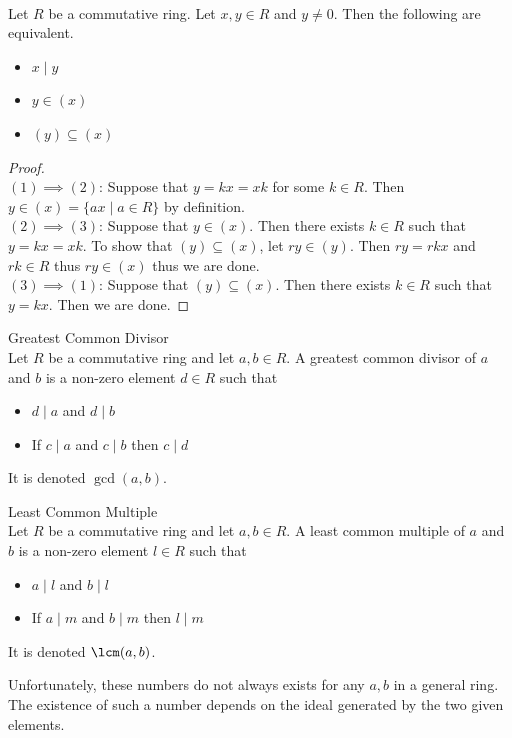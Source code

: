 \documentclass[a4paper]{article}
\begin{document}
\begin{prp}{}{}\\
Let $R$ be a commutative ring. Let $x,y\in R$ and $y\neq 0$. Then the following are equivalent. 
\begin{itemize}
\item $x\;|\;y$
\item $y\in(x)$
\item $(y)\subseteq(x)$
\end{itemize}
\begin{proof}\\
$(1)\implies(2)$: Suppose that $y=kx=xk$ for some $k\in R$. Then $y\in(x)=\{ax\;|\;a\in R\}$ by definition. \\

$(2)\implies(3)$: Suppose that $y\in(x)$. Then there exists $k\in R$ such that $y=kx=xk$. To show that $(y)\subseteq(x)$, let $ry\in(y)$. Then $ry=rkx$ and $rk\in R$ thus $ry\in(x)$ thus we are done. \\

$(3)\implies(1)$: Suppose that $(y)\subseteq(x)$. Then there exists $k\in R$ such that $y=kx$. Then we are done. 
\end{proof}
\end{prp}

\begin{defn}{Greatest Common Divisor}{}\\
Let $R$ be a commutative ring and let $a,b\in R$. A greatest common divisor of $a$ and $b$ is a non-zero element $d\in R$ such that 
\begin{itemize}
\item $d\;|\;a$ and $d\;|\;b$
\item If $c\;|\;a$ and $c\;|\;b$ then $c\;|\;d$
\end{itemize} It is denoted $\gcd(a,b)$. 
\end{defn}

\begin{defn}{Least Common Multiple}{}\\
Let $R$ be a commutative ring and let $a,b\in R$. A least common multiple of $a$ and $b$ is a non-zero element $l\in R$ such that 
\begin{itemize}
\item $a\;|\;l$ and $b\;|\;l$
\item If $a\;|\;m$ and $b\;|\;m$ then $l\;|\;m$
\end{itemize} It is denoted $\lcm(a,b)$. 
\end{defn}

Unfortunately, these numbers do not always exists for any $a,b$ in a general ring. The existence of such a number depends on the ideal generated by the two given elements. 
\end{document}

